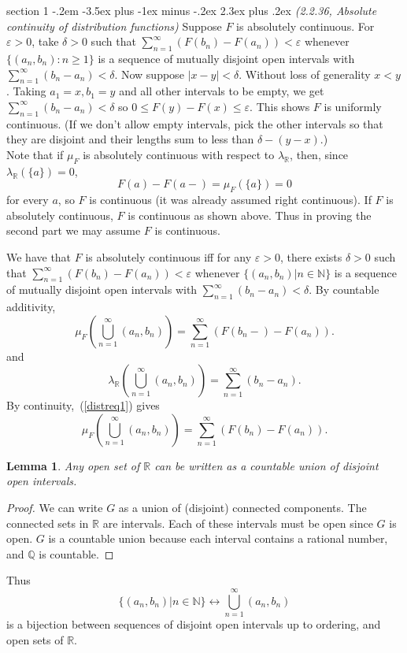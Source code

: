 \documentclass[12pt]{article}
\makeatletter
\theoremstyle{norm}
\newtheorem{lem}[thm]{Lemma}
\newcommand{\N}[0]{\mathbb{N}}
\newcommand{\Q}[0]{\mathbb{Q}}
\newcommand{\R}[0]{\mathbb{R}}
\newcommand{\de}[0]{\delta}
\newcommand{\ep}[0]{\varepsilon}
\newcommand{\la}[0]{\lambda}
\newcommand{\pa}[1]{\left( {#1} \right)}
\newenvironment{problem}{\@startsection
       {section}
       {1}
       {-.2em}
       {-3.5ex plus -1ex minus -.2ex}
       {2.3ex plus .2ex}
       {\pagebreak[3]%
       \large\bf\noindent{Problem }
       }
       }
       {%
       }
\makeatother
\begin{document}
\begin{problem}{\it(2.2.36, Absolute continuity of distribution functions)}
Suppose $F$ is absolutely continuous. For $\ep>0$, take $\de>0$ such that $\sum_{n=1}^{\infty} (F(b_n)-F(a_n))<\ep$ whenever $\{(a_n,b_n):n\geq 1\}$ is a sequence of mutually disjoint open intervals with $\sum_{n=1}^{\infty} (b_n-a_n)<\de$. Now suppose $|x-y|<\de$. Without loss of generality $x<y$. Taking $a_1=x,b_1=y$ and all other intervals to be empty, we get $\sum_{n=1}^{\infty} (b_n-a_n)<\de$ so $0\leq F(y)-F(x)\leq \ep$. This shows $F$ is uniformly continuous.
(If we don't allow empty intervals, pick the other intervals so that they are disjoint and their lengths sum to less than $\de-(y-x)$.)\\

Note that if $\mu_F$ is absolutely continuous with respect to $\la_{\R}$, then, since $\la_{\R}(\{a\})=0$, 
\[F(a)-F(a-)=\mu_F(\{a\})=0\]
for every $a$, so $F$ is continuous (it was already assumed right continuous). If $F$ is absolutely continuous, $F$ is continuous as shown above. Thus in proving the second part we may assume $F$ is continuous.

We have that $F$ is absolutely continuous iff for any $\ep>0$, there exists $\de>0$ such that $\sum_{n=1}^{\infty} (F(b_n)-F(a_n))<\ep$ whenever $\{(a_n,b_n)|n\in \N\}$ is a sequence of mutually disjoint open intervals with $\sum_{n=1}^{\infty} (b_n-a_n)<\de$. By countable additivity,
\begin{equation}\label{distreq1}
\mu_F\pa{\bigcup_{n=1}^{\infty} (a_n,b_n)}=\sum_{n=1}^{\infty} (F(b_n-)-F(a_n)).
\end{equation}
and 
\begin{equation}\label{distreq2}
\la_{\R}\pa{
\bigcup_{n=1}^{\infty} (a_n,b_n)}=\sum_{n=1}^{\infty} (b_n-a_n)
.
\end{equation}
By continuity,~(\ref{distreq1}) gives
\begin{equation}\label{distreq3}
\mu_F\pa{\bigcup_{n=1}^{\infty} (a_n,b_n)}=\sum_{n=1}^{\infty} (F(b_n)-F(a_n)).
\end{equation}
\begin{lem}\label{openctun}
Any open set of $\R$ can be written as a countable union of disjoint open intervals.
\end{lem}
\begin{proof}
We can write $G$ as a union of (disjoint) connected components. The connected sets in $\R$ are intervals. Each of these intervals must be open since $G$ is open. $G$ is a countable union because each interval contains a rational number, and $\Q$ is countable.
\end{proof}
Thus 
\begin{equation}\label{bij}
\{(a_n,b_n)|n\in \N\}\leftrightarrow \bigcup_{n=1}^{\infty}(a_n,b_n)
\end{equation}
is a bijection between sequences of disjoint open intervals up to ordering, and open sets of $\R$.


\end{problem}
\end{document}
